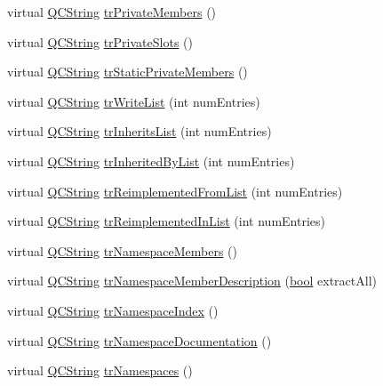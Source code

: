 \begin{DoxyCompactItemize}
virtual \hyperlink{class_q_c_string}{Q\+C\+String} \hyperlink{class_translator_arabic_aab9514df0e4b2d87ebe84285dc39faef}{tr\+Private\+Members} ()
\item 
virtual \hyperlink{class_q_c_string}{Q\+C\+String} \hyperlink{class_translator_arabic_a1e14883fe9d6ae0337d1b6331decb470}{tr\+Private\+Slots} ()
\item 
virtual \hyperlink{class_q_c_string}{Q\+C\+String} \hyperlink{class_translator_arabic_ae163b07dd2f1c473cca948e85c719bda}{tr\+Static\+Private\+Members} ()
\item 
virtual \hyperlink{class_q_c_string}{Q\+C\+String} \hyperlink{class_translator_arabic_ae18e9a21f88b459c24099e2517ba10d8}{tr\+Write\+List} (int num\+Entries)
\item 
virtual \hyperlink{class_q_c_string}{Q\+C\+String} \hyperlink{class_translator_arabic_addbed4b78219a76378934b026c78e0cd}{tr\+Inherits\+List} (int num\+Entries)
\item 
virtual \hyperlink{class_q_c_string}{Q\+C\+String} \hyperlink{class_translator_arabic_a1f08fac4cb3e1a2956cf4646af2b1a01}{tr\+Inherited\+By\+List} (int num\+Entries)
\item 
virtual \hyperlink{class_q_c_string}{Q\+C\+String} \hyperlink{class_translator_arabic_af3bc590702619fc2294ce4ca0f27721a}{tr\+Reimplemented\+From\+List} (int num\+Entries)
\item 
virtual \hyperlink{class_q_c_string}{Q\+C\+String} \hyperlink{class_translator_arabic_ab3ae400f56c2865c3c7342f02602035d}{tr\+Reimplemented\+In\+List} (int num\+Entries)
\item 
virtual \hyperlink{class_q_c_string}{Q\+C\+String} \hyperlink{class_translator_arabic_a165f528cf438e8258be63bf31529d5ba}{tr\+Namespace\+Members} ()
\item 
virtual \hyperlink{class_q_c_string}{Q\+C\+String} \hyperlink{class_translator_arabic_a858be185447774aad0de46653d323c90}{tr\+Namespace\+Member\+Description} (\hyperlink{qglobal_8h_a1062901a7428fdd9c7f180f5e01ea056}{bool} extract\+All)
\item 
virtual \hyperlink{class_q_c_string}{Q\+C\+String} \hyperlink{class_translator_arabic_ae9eed5c2d22d24d59a2cb6c0cdca53dd}{tr\+Namespace\+Index} ()
\item 
virtual \hyperlink{class_q_c_string}{Q\+C\+String} \hyperlink{class_translator_arabic_aa157f3ffdd040f965526955e65f023e6}{tr\+Namespace\+Documentation} ()
\item 
virtual \hyperlink{class_q_c_string}{Q\+C\+String} \hyperlink{class_translator_arabic_a3b13e16742b3abf9aaec6c0a3911da95}{tr\+Namespaces} ()

\end{DoxyCompactItemize}
